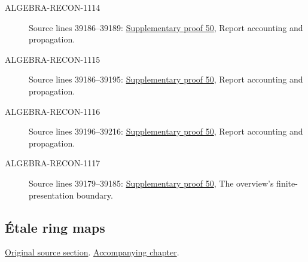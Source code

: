 \begin{description}
\item[ALGEBRA-RECON-1114] Source lines 39186--39189: \hyperlink{algebra_smooth_artin_notes_20260928}{Supplementary proof 50}, Report accounting and propagation.
\item[ALGEBRA-RECON-1115] Source lines 39186--39195: \hyperlink{algebra_smooth_artin_notes_20260928}{Supplementary proof 50}, Report accounting and propagation.
\item[ALGEBRA-RECON-1116] Source lines 39196--39216: \hyperlink{algebra_smooth_artin_notes_20260928}{Supplementary proof 50}, Report accounting and propagation.
\item[ALGEBRA-RECON-1117] Source lines 39179--39185: \hyperlink{algebra_smooth_artin_notes_20260928}{Supplementary proof 50}, The overview's finite-presentation boundary.
\end{description}

\subsection{\'Etale ring maps}
\hypertarget{algebra-source-section-etale}{}
\noindent\href{https://github.com/stacks/stacks-project/blob/a04446e57ec1fbc252a871afcec7752fb2807b14/algebra.tex\#L39236}{Original source section}. \href{algebra.pdf\#nameddest=section-etale}{Accompanying chapter}.

